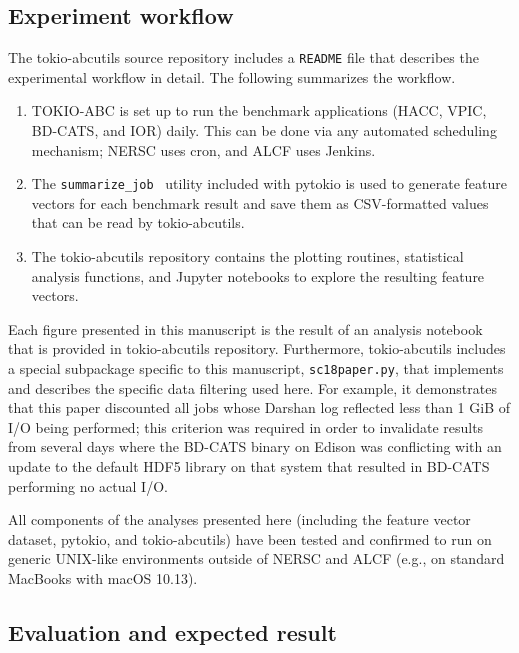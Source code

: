 \subsection{Experiment workflow}

The tokio-abcutils source repository includes a \texttt{README} file that describes the experimental workflow in detail.
The following summarizes the workflow.

\begin{enumerate}[leftmargin=*]

\item TOKIO-ABC is set up to run the benchmark applications (HACC, VPIC, BD-CATS, and IOR) daily.
This can be done via any automated scheduling mechanism; NERSC uses cron, and ALCF uses Jenkins.

\item The \texttt{summarize\_job}~\cite{Lockwood2018tokio} utility included with pytokio is used to generate feature vectors for each benchmark result and save them as CSV-formatted values that can be read by tokio-abcutils.

\item The tokio-abcutils repository contains the plotting routines, statistical analysis functions, and Jupyter notebooks to explore the resulting feature vectors.

\end{enumerate}

Each figure presented in this manuscript is the result of an analysis notebook that is provided in tokio-abcutils repository.
Furthermore, tokio-abcutils includes a special subpackage specific to this manuscript, \texttt{sc18paper.py}, that implements and describes the specific data filtering used here.
For example, it demonstrates that this paper discounted all jobs whose Darshan log reflected less than 1 GiB of I/O being performed; this criterion was required in order to invalidate results from several days where the BD-CATS binary on Edison was conflicting with an update to the default HDF5 library on that system that resulted in BD-CATS performing no actual I/O.

All components of the analyses presented here (including the feature vector dataset, pytokio, and tokio-abcutils) have been tested and confirmed to run on generic UNIX-like environments outside of NERSC and ALCF (e.g., on standard MacBooks with macOS 10.13).

\subsection{Evaluation and expected result}

